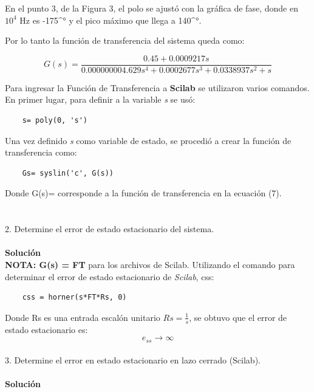 \documentclass[12pt,letterpaper]{article}
\begin{document}
En el punto 3, de la Figura 3, el polo se ajustó con la gráfica de fase, donde en $10^4$ Hz es -175$\^°$ y el pico máximo que llega a 140$\^°$.

Por lo tanto la función de transferencia del sistema queda como:

\begin{equation}
    G(s) = \frac{0.45+ 0.0009217s}{0.000000004.629s^4+0.0002677s^3+0.0338937s^2 +s}
\end{equation}

Para ingresar la Función de Transferencia a \textbf{Scilab} se utilizaron varios comandos. En primer lugar, para definir a la variable \textit{s} se usó:

\begin{verbatim}
    s= poly(0, 's')
\end{verbatim}

Una vez definido \textit{s} como variable de estado, se procedió a crear la función de transferencia como:

\begin{verbatim}
    Gs= syslin('c', G(s))
\end{verbatim}

Donde G(s)= corresponde a la función de transferencia en la ecuación (7).\\

\\
\\
2. Determine el error de estado estacionario del sistema.\\
\\
\textbf{Solución}\\


\textbf{NOTA: G(s) = FT} para los archivos de Scilab.
Utilizando el comando para determinar el error de estado estacionario de \textit{Scilab}, css:

\begin{verbatim}
    css = horner(s*FT*Rs, 0)
\end{verbatim}

Donde Rs es una entrada escalón unitario $Rs = \frac{1}{s}$, se obtuvo que el error de estado estacionario es:
\begin{equation}
    e_{ss} \to \infty
\end{equation}
\\

3. Determine el error en estado estacionario en lazo cerrado (Scilab).\\
\\
\textbf{Solución}\\
\end{document}
